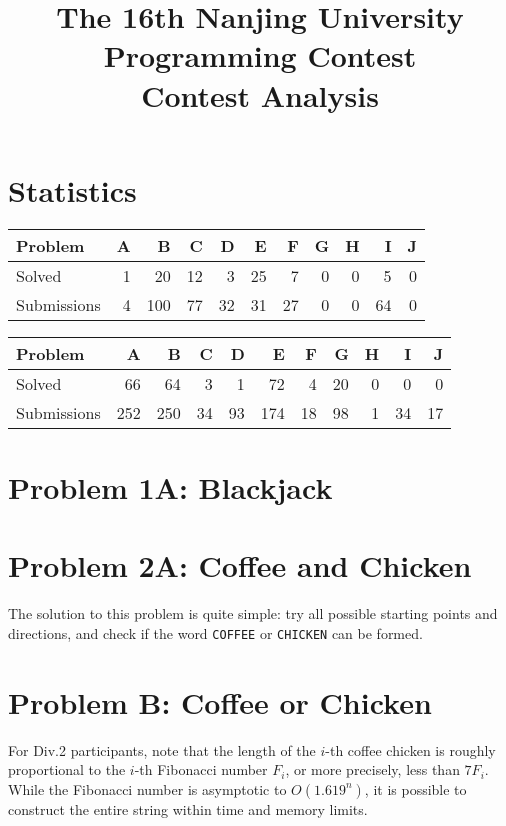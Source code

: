 \documentclass[a4paper,10.5pt,twoside]{article}
\title{\LARGE{The 16th Nanjing University Programming Contest} \\ Contest Analysis}
\begin{document}
\maketitle

\section*{Statistics}

\begin{table}[h]
\centering
\begin{tabular}{|l|rrrrrrrrrr|}
\hline
Problem & A & B & C & D & E & F & G & H & I & J \\ \hline
Solved & 1 & 20 & 12 & 3 & 25 & 7 & 0 & 0 & 5 & 0 \\
Submissions & 4 & 100 & 77 & 32 & 31 & 27 & 0 & 0 & 64 & 0 \\ \hline
\end{tabular}

\begin{tabular}{|l|rrrrrrrrrr|}
\hline
Problem & A & B & C & D & E & F & G & H & I & J \\ \hline
Solved & 66 & 64 & 3 & 1 & 72 & 4 & 20 & 0 & 0 & 0 \\
Submissions & 252 & 250 & 34 & 93 & 174 & 18 & 98 & 1 & 34 & 17 \\ \hline
\end{tabular}

\end{table}

\section*{Problem 1A: Blackjack}

\section*{Problem 2A: Coffee and Chicken}
The solution to this problem is quite simple: try all possible starting points and directions, and check if the word \texttt{COFFEE} or \texttt{CHICKEN} can be formed.

\section*{Problem B: Coffee or Chicken}
For Div.2 participants, note that the length of the $i$-th coffee chicken is roughly proportional to the $i$-th Fibonacci number $F_i$, or more precisely, less than $7F_i$. While the Fibonacci number is asymptotic to $O(1.619^n)$, it is possible to construct the entire string within time and memory limits.
\end{document}
